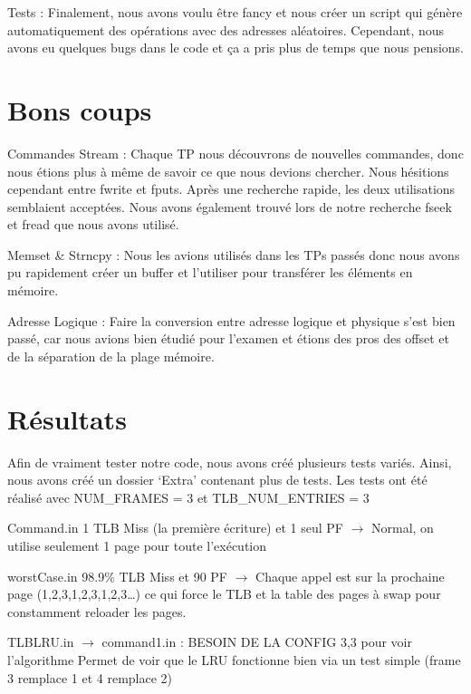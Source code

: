 \documentclass{article}
\begin{document}
\par
Tests : Finalement, nous avons voulu être fancy et nous créer un script qui génère automatiquement des opérations avec des adresses aléatoires. Cependant, nous avons eu quelques bugs dans le code et ça a pris plus de temps que nous pensions. 

\section {Bons coups}
\par
Commandes Stream : Chaque TP nous découvrons de nouvelles commandes, donc nous étions plus à même de savoir ce que nous devions chercher. Nous hésitions cependant entre fwrite et fputs. Après une recherche rapide, les deux utilisations semblaient acceptées. Nous avons également trouvé lors de notre recherche fseek et fread que nous avons utilisé.


\par
Memset \& Strncpy : Nous les avions utilisés dans les TPs passés donc nous avons pu rapidement créer un buffer et l’utiliser pour transférer les éléments en mémoire.


\par
Adresse Logique : Faire la conversion entre adresse logique et physique s’est bien passé, car nous avions bien étudié pour l’examen et étions des pros des offset et de la séparation de la plage mémoire.


\par
\section{Résultats}
Afin de vraiment tester notre code, nous avons créé plusieurs tests variés. Ainsi, nous avons créé un dossier ‘Extra’ contenant plus de tests. Les tests ont été réalisé avec  NUM\_FRAMES = 3 et  TLB\_NUM\_ENTRIES = 3

Command.in
1 TLB Miss (la première écriture) et 1 seul PF $\rightarrow $ Normal, on utilise seulement 1 page pour toute l’exécution

worstCase.in
98.9\% TLB Miss et 90 PF $\rightarrow $ Chaque appel est sur la prochaine page (1,2,3,1,2,3,1,2,3…) ce qui force le TLB et la table des pages à swap pour constamment reloader les pages.

TLBLRU.in $\rightarrow $ command1.in : BESOIN DE LA CONFIG 3,3 pour voir l'algorithme
Permet de voir que le LRU fonctionne bien via un test simple (frame 3 remplace 1 et 4 remplace 2)
\end{document}
